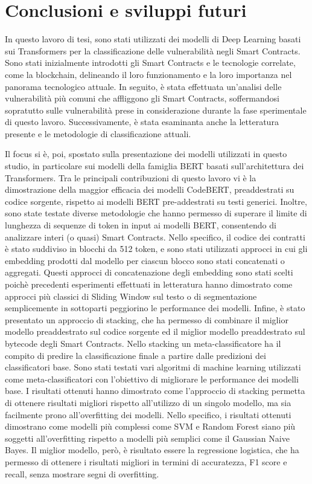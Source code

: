 \documentclass[../../Thesis.tex]{subfiles}
\begin{document}
\chapter{Conclusioni e sviluppi futuri}
\label{cap:conclusioni}
In questo lavoro di tesi, sono stati utilizzati dei modelli di Deep Learning basati sui Transformers per la classificazione delle vulnerabilit\`a negli Smart Contracts. Sono stati inizialmente introdotti gli Smart Contracts e le tecnologie correlate, come la blockchain, delineando il loro funzionamento e la loro importanza nel panorama tecnologico attuale. In seguito, \`e stata effettuata un'analisi delle vulnerabilit\`a pi\`u comuni che affliggono gli Smart Contracts, soffermandosi sopratutto sulle vulnerabilit\`a prese in considerazione durante la fase sperimentale di questo lavoro. Successivamente, \`e stata esaminanta anche la letteratura presente e le metodologie di classificazione attuali. 

Il focus si \`e, poi, spostato sulla presentazione dei modelli utilizzati in questo studio, in particolare sui modelli della famiglia BERT basati sull'architettura dei Transformers. Tra le principali contribuzioni di questo lavoro vi \`e la dimostrazione della maggior efficacia dei modelli CodeBERT, preaddestrati su codice sorgente, rispetto ai modelli BERT pre-addestrati su testi generici. 
Inoltre, sono state testate diverse metodologie che hanno permesso di superare il limite di lunghezza di sequenze di token in input ai modelli BERT, consentendo di analizzare interi (o quasi) Smart Contracts. Nello specifico, il codice dei contratti \`e stato suddiviso in blocchi da 512 token, e sono stati utilizzati approcci in cui gli embedding prodotti dal modello per ciascun blocco sono stati concatenati o aggregati. Questi approcci di concatenazione degli embedding sono stati scelti poich\`e precedenti esperimenti effettuati in letteratura hanno dimostrato come approcci pi\`u classici di Sliding Window sul testo o di segmentazione semplicemente in sottoparti peggiorino le performance dei modelli.
Infine, \`e stato presentato un approccio di stacking, che ha permesso di combinare il miglior modello preaddestrato sul codice sorgente ed il miglior modello preaddestrato sul bytecode degli Smart Contracts. Nello stacking un meta-classificatore ha il compito di predire la classificazione finale a partire dalle predizioni dei classificatori base. Sono stati testati vari algoritmi di machine learning utilizzati come meta-classificatori con l'obiettivo di migliorare le performance dei modelli base. I risultati ottenuti hanno dimostrato come l'approccio di stacking permetta di ottenere risultati migliori rispetto all'utilizzo di un singolo modello, ma sia facilmente prono all'overfitting dei modelli. Nello specifico, i risultati ottenuti dimostrano come modelli pi\`u complessi come SVM e Random Forest siano pi\`u soggetti all'overfitting rispetto a modelli pi\`u semplici come il Gaussian Naive Bayes. Il miglior modello, per\`o, \`e risultato essere la regressione logistica, che ha permesso di ottenere i risultati migliori in termini di accuratezza, F1 score e recall, senza mostrare segni di overfitting. 
\end{document}
